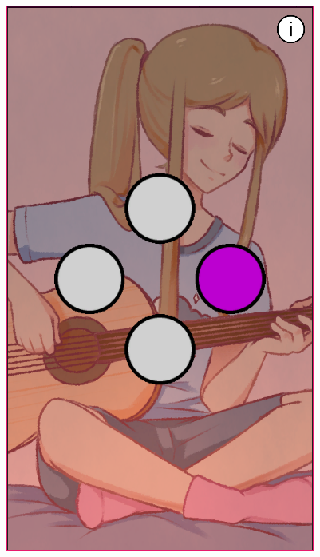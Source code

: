 \begin{figure}[h]
    \centering
    \begin{minipage}{.22\textwidth}
        \includegraphics[width=\textwidth]{imgs/screenshot14.png}
    \end{minipage}
    \begin{minipage}{.22\textwidth}

\end{minipage}
\end{figure}
